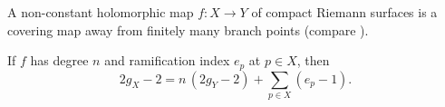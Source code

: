  

A non-constant holomorphic map $f\colon X\to Y$ of compact Riemann surfaces is a
covering map away from finitely many branch points (compare ).

\begin{theorem}
If $f$ has degree $n$ and ramification index $e_p$ at $p\in X$, then
\begin{equation}\label{eq:RH}
  2g_X - 2 = n\,(2g_Y - 2) + \sum_{p\in X} (e_p - 1).
\end{equation}
\end{theorem}
